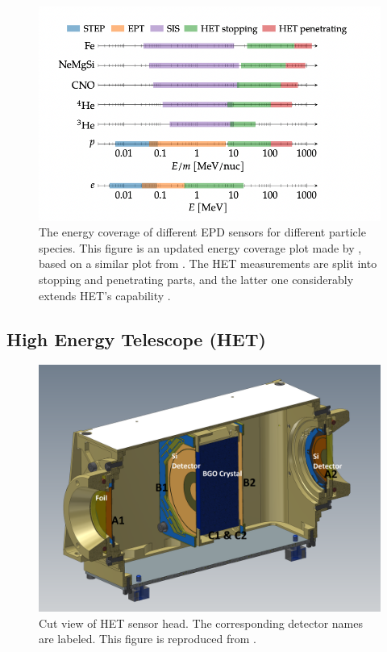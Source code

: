 \begin{figure}
    \centering
    \includegraphics[width = \textwidth]{images/EPD_coverage.png}
    \caption[The energy coverage of different \ac{EPD} sensors]{The energy coverage of different \ac{EPD} sensors for different particle species. This figure is an updated energy coverage plot made by \citet{JohanPhd2020}, based on a similar plot from \citet{RodriguezPacheco-2019-EPD}. The HET measurements are split into stopping and penetrating parts, and the latter one considerably extends \ac{HET}'s capability \citep{Elftmann-2020-PhD}.}
    \label{Fig:EPD-energy-coverage}
\end{figure}  

\subsection*{High Energy Telescope (HET)}

\begin{figure}
    \centering
    \includegraphics[width = \textwidth]{images/het.png}
    \caption[Cut view of \ac{HET} sensor head]{Cut view of \ac{HET} sensor head. The corresponding detector names are labeled. This figure is reproduced from \citet{RodriguezPacheco-2019-EPD}.}
    \label{fig:HET-sensor-head}
\end{figure}

